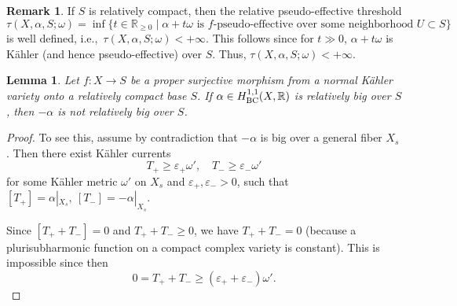 \documentclass[12pt]{amsart}
\numberwithin{equation}{section}
\newtheorem{lemma}  [theorem]     {Lemma}
\theoremstyle{definition}
\theoremstyle{plain}
\newtheorem*{thm A*}{Theorem A}
\newtheorem*{thm B*}{Theorem B}
\newtheorem*{thm C*}{Theorem C}
\newtheorem*{thm D*}{Theorem D}
\theoremstyle{definition}
\newtheorem{remark}  [theorem]     {Remark}
\renewcommand{\1}{\mathds{1}}
\renewcommand{\>}{\rightarrow}
\newcommand{\R}{\mathbb R}
\begin{document}
\begin{remark}\label{r-pseft} If $S$ is relatively compact, then the relative pseudo-effective threshold
$$\tau(X,\alpha,S;\omega) = \inf\{ t\in \mathbb{R}_{\ge 0}\mid  \alpha + t \omega \text{ is }f\text{-pseudo-effective over some neighborhood } U\subset S \}$$ 
is well defined, i.e.,\ $\tau (X, \alpha ,S ;\omega)<+\infty$. This follows since for $t\gg 0$, 
$\alpha+t\omega$ is K\"ahler (and hence pseudo-effective) over $S$. Thus, $\tau (X,\alpha ,S;\omega)<+\infty$.
\end{remark}

\begin{lemma}\label{Lemma: relativebig}
Let $f:X\to S$ be a proper surjective morphism from a normal K\"ahler variety onto a relatively compact base $S$. If $\alpha \in H^{1,1}_{\rm{BC}}(X, \R)$ is relatively big over $S$, then $-\alpha$ is not relatively big over $S$. 
\end{lemma}
\begin{proof}
To see this, assume by contradiction that  $-\alpha$ is big over a general fiber $X_s$. 
Then there exist K\"ahler currents
\[
T_+ \ge \varepsilon_+ \omega',\quad T_- \ge \varepsilon_- \omega'
\]
for some K\"ahler metric $\omega'$ on $X_s$ and $\varepsilon_+, \varepsilon_->0$, such that $[T_+]=\alpha|_{X_s},\ [T_-]=-\alpha|_{X_s}$.

Since $[T_+ + T_-] = 0$ and $T_+  +T_- \ge 0$, we have $T_+ + T_-= 0$ (because a plurisubharmonic function on a compact complex variety is constant). This is impossible since then $$0 =T_+ + T_- \ge (\varepsilon_+ + \varepsilon_-) \omega'.$$
\end{proof}
\end{document}

